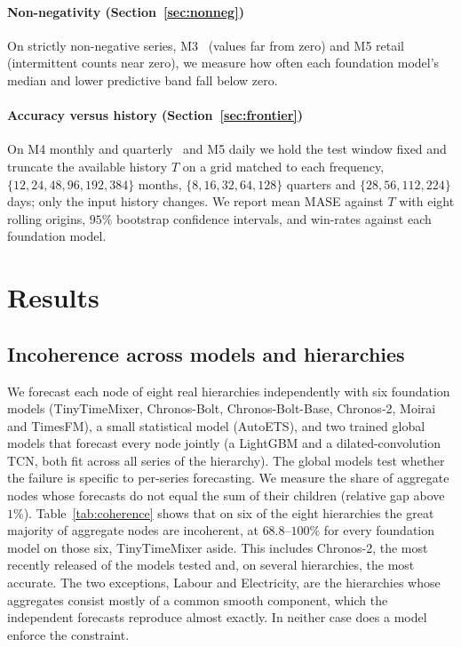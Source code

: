 \documentclass[review,number]{elsarticle}
\begin{document}
\paragraph{Non-negativity (Section~\ref{sec:nonneg})} On strictly non-negative series,
M3~\citep{data_m3} (values far from zero) and M5 retail~\citep{data_m5} (intermittent
counts near zero), we measure how often each foundation model's median and lower
predictive band fall below zero.

\paragraph{Accuracy versus history (Section~\ref{sec:frontier})} On M4 monthly and
quarterly~\citep{data_m4} and M5 daily we hold the test window fixed and truncate the
available history $T$ on a grid matched to each frequency, $\{12,24,48,96,192,384\}$
months, $\{8,16,32,64,128\}$ quarters and $\{28,56,112,224\}$ days; only the input
history changes.
We report mean MASE against $T$ with eight rolling origins, $95\%$ bootstrap
confidence intervals, and win-rates against each foundation model.

\section{Results}
\label{sec:results}

\subsection{Incoherence across models and hierarchies}
\label{sec:coherence}
We forecast each node of eight real hierarchies independently with six foundation
models (TinyTimeMixer, Chronos-Bolt, Chronos-Bolt-Base, Chronos-2, Moirai and TimesFM),
a small statistical model (AutoETS), and two trained global models that forecast every
node jointly (a LightGBM and a dilated-convolution TCN, both fit across all series of
the hierarchy). The global models test whether the failure is specific to per-series
forecasting. We measure the share of aggregate nodes whose forecasts do not equal the
sum of their children (relative gap above $1\%$). Table~\ref{tab:coherence} shows that on
six of the eight hierarchies the great majority of aggregate nodes are incoherent, at
$68.8$--$100\%$ for every foundation model on those six, TinyTimeMixer aside. This
includes Chronos-2, the most recently released of the models tested and, on several
hierarchies, the most accurate.
The two exceptions, Labour and Electricity, are the hierarchies whose
aggregates consist mostly of a common smooth component, which the independent forecasts
reproduce almost exactly. In neither case does a model enforce the constraint.
\end{document}
